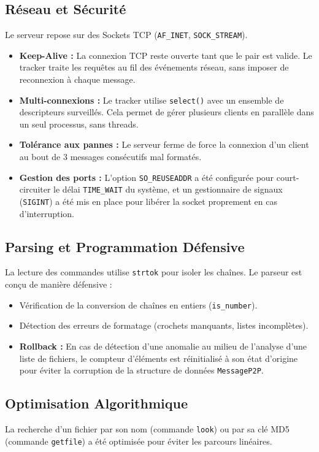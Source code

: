 \documentclass[11pt, a4paper]{article}
\begin{document}
\subsection{Réseau et Sécurité}
Le serveur repose sur des Sockets TCP (\texttt{AF\_INET}, \texttt{SOCK\_STREAM}).
\begin{itemize}
    \item \textbf{Keep-Alive :} La connexion TCP reste ouverte tant que le pair est valide. Le tracker traite les requêtes au fil des événements réseau, sans imposer de reconnexion à chaque message.
    \item \textbf{Multi-connexions :} Le tracker utilise \texttt{select()} avec un ensemble de descripteurs surveillés. Cela permet de gérer plusieurs clients en parallèle dans un seul processus, sans threads.
    \item \textbf{Tolérance aux pannes :} Le serveur ferme de force la connexion d'un client au bout de 3 messages consécutifs mal formatés.
    \item \textbf{Gestion des ports :} L'option \texttt{SO\_REUSEADDR} a été configurée pour court-circuiter le délai \texttt{TIME\_WAIT} du système, et un gestionnaire de signaux (\texttt{SIGINT}) a été mis en place pour libérer la socket proprement en cas d'interruption.
\end{itemize}

\subsection{Parsing et Programmation Défensive}
La lecture des commandes utilise \texttt{strtok} pour isoler les chaînes. Le parseur est conçu de manière défensive :
\begin{itemize}
    \item Vérification de la conversion de chaînes en entiers (\texttt{is\_number}).
    \item Détection des erreurs de formatage (crochets manquants, listes incomplètes).
    \item \textbf{Rollback :} En cas de détection d'une anomalie au milieu de l'analyse d'une liste de fichiers, le compteur d'éléments est réinitialisé à son état d'origine pour éviter la corruption de la structure de données \texttt{MessageP2P}.
\end{itemize}

\subsection{Optimisation Algorithmique}
La recherche d'un fichier par son nom (commande \texttt{look}) ou par sa clé MD5 (commande \texttt{getfile}) a été optimisée pour éviter les parcours linéaires.
\end{document}
